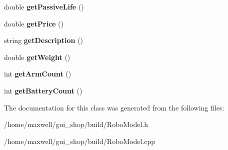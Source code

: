 \begin{DoxyCompactItemize}
\item 
double {\bfseries get\+Passive\+Life} ()\hypertarget{classRoboModel_a08dd55045dccb3d4a813d4873df736f0}{}\label{classRoboModel_a08dd55045dccb3d4a813d4873df736f0}

\item 
double {\bfseries get\+Price} ()\hypertarget{classRoboModel_a71dc72856f61878f3e9403cab60d8382}{}\label{classRoboModel_a71dc72856f61878f3e9403cab60d8382}

\item 
string {\bfseries get\+Description} ()\hypertarget{classRoboModel_adffed46f73dfb49c02adabf96f91ebb4}{}\label{classRoboModel_adffed46f73dfb49c02adabf96f91ebb4}

\item 
double {\bfseries get\+Weight} ()\hypertarget{classRoboModel_a86dc373993b37f0c33c00feafc8d6ffa}{}\label{classRoboModel_a86dc373993b37f0c33c00feafc8d6ffa}

\item 
int {\bfseries get\+Arm\+Count} ()\hypertarget{classRoboModel_ab366b831c341280e04d0855c0bcdbe9a}{}\label{classRoboModel_ab366b831c341280e04d0855c0bcdbe9a}

\item 
int {\bfseries get\+Battery\+Count} ()\hypertarget{classRoboModel_a6074b5258f50030f658883c5626e3ed8}{}\label{classRoboModel_a6074b5258f50030f658883c5626e3ed8}

\end{DoxyCompactItemize}


The documentation for this class was generated from the following files\+:\begin{DoxyCompactItemize}
\item 
/home/maxwell/gui\+\_\+shop/build/Robo\+Model.\+h\item 
/home/maxwell/gui\+\_\+shop/build/Robo\+Model.\+cpp\end{DoxyCompactItemize}
